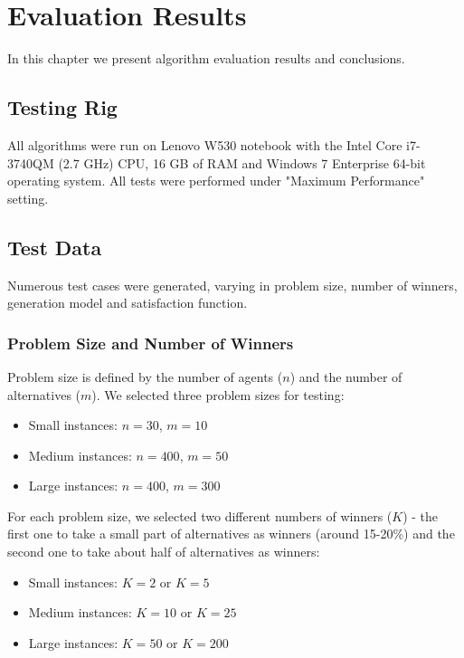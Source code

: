 \chapter{Evaluation Results}
\label{cha:evaluationResults}

In this chapter we present algorithm evaluation results and conclusions.

\section{Testing Rig}

All algorithms were run on Lenovo W530 notebook with the Intel Core i7-3740QM (2.7 GHz) CPU, 16 GB of RAM and Windows 7 Enterprise 64-bit operating system. All tests were performed under "Maximum Performance" setting.

\section{Test Data}

Numerous test cases were generated, varying in problem size, number of winners, generation model and satisfaction function.

\subsection{Problem Size and Number of Winners}

Problem size is defined by the number of agents ($n$) and the number of alternatives ($m$). We selected three problem sizes for testing:
\begin{itemize}
	\item Small instances: $n = 30$, $m = 10$
	\item Medium instances: $n = 400$, $m = 50$
	\item Large instances: $n = 400$, $m = 300$
\end{itemize}

For each problem size, we selected two different numbers of winners ($K$) - the first one to take a small part of alternatives as winners (around 15-20\%) and the second one to take about half of alternatives as winners:
\begin{itemize}
	\item Small instances: $K = 2$ or $K = 5$
	\item Medium instances: $K = 10$ or $K = 25$
	\item Large instances: $K = 50$ or $K = 200$
\end{itemize}

